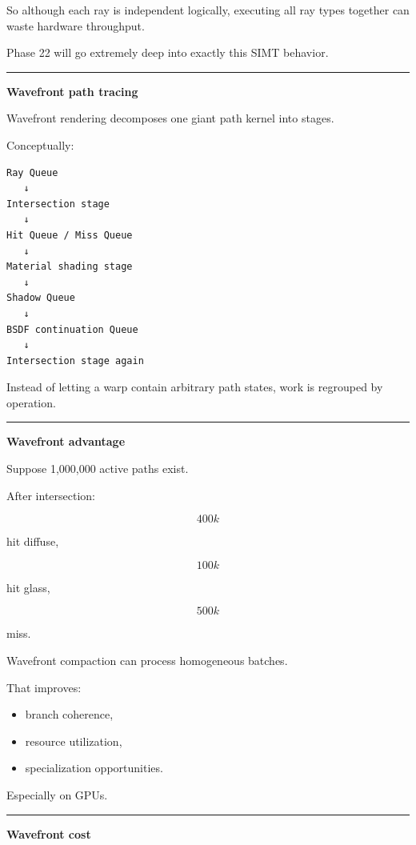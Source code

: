 So although each ray is independent logically, executing all ray types together can waste hardware throughput.

Phase 22 will go extremely deep into exactly this SIMT behavior.

\begin{center}\rule{0.5\linewidth}{0.5pt}\end{center}

\textbf{Wavefront path tracing}

Wavefront rendering decomposes one giant path kernel into stages.

Conceptually:

\begin{verbatim}
Ray Queue
   ↓
Intersection stage
   ↓
Hit Queue / Miss Queue
   ↓
Material shading stage
   ↓
Shadow Queue
   ↓
BSDF continuation Queue
   ↓
Intersection stage again
\end{verbatim}

Instead of letting a warp contain arbitrary path states, work is regrouped by operation.

\begin{center}\rule{0.5\linewidth}{0.5pt}\end{center}

\textbf{Wavefront advantage}

Suppose 1,000,000 active paths exist.

After intersection:

\[
400k
\]

hit diffuse,

\[
100k
\]

hit glass,

\[
500k
\]

miss.

Wavefront compaction can process homogeneous batches.

That improves:

\begin{itemize}
\tightlist
\item
  branch coherence,
\item
  resource utilization,
\item
  specialization opportunities.
\end{itemize}

Especially on GPUs.

\begin{center}\rule{0.5\linewidth}{0.5pt}\end{center}

\textbf{Wavefront cost}

